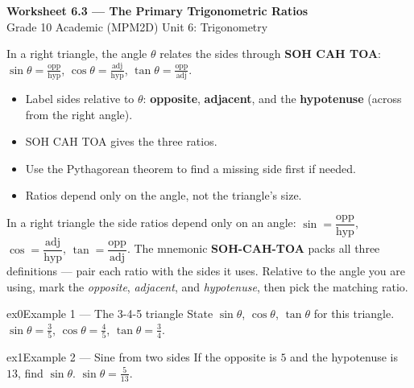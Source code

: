 \documentclass[11pt]{article}
\begin{document}
\begin{center}
{\LARGE\bfseries\color{titleblue}Worksheet 6.3 --- The Primary Trigonometric Ratios}\\[2pt]
{\small Grade 10 Academic (MPM2D) \textperiodcentered{} Unit 6: Trigonometry}
\end{center}

\begin{ideabox}
In a right triangle, the angle $\theta$ relates the sides through \textbf{SOH CAH TOA}: $\sin\theta=\tfrac{\text{opp}}{\text{hyp}}$, $\cos\theta=\tfrac{\text{adj}}{\text{hyp}}$, $\tan\theta=\tfrac{\text{opp}}{\text{adj}}$.
\begin{itemize}[leftmargin=*,itemsep=2pt]
  \item Label sides relative to $\theta$: \textbf{opposite}, \textbf{adjacent}, and the \textbf{hypotenuse} (across from the right angle).
  \item SOH CAH TOA gives the three ratios.
  \item Use the Pythagorean theorem to find a missing side first if needed.
  \item Ratios depend only on the angle, not the triangle's size.
\end{itemize}
\end{ideabox}

\begin{learnbox}
In a right triangle the side ratios depend only on an angle: $\sin=\dfrac{\text{opp}}{\text{hyp}}$, $\cos=\dfrac{\text{adj}}{\text{hyp}}$, $\tan=\dfrac{\text{opp}}{\text{adj}}$.
The mnemonic \textbf{SOH-CAH-TOA} packs all three definitions — pair each ratio with the sides it uses.
Relative to the angle you are using, mark the \emph{opposite}, \emph{adjacent}, and \emph{hypotenuse}, then pick the matching ratio.
\end{learnbox}


\begin{example}{ex0}{Example 1 --- The 3-4-5 triangle}
State $\sin\theta$, $\cos\theta$, $\tan\theta$ for this triangle.
\soln $\sin\theta=\tfrac35$, $\cos\theta=\tfrac45$, $\tan\theta=\tfrac34.$
\end{example}

\begin{example}{ex1}{Example 2 --- Sine from two sides}
If the opposite is $5$ and the hypotenuse is $13$, find $\sin\theta$.
\soln $\sin\theta=\tfrac{5}{13}.$
\end{example}
\end{document}
